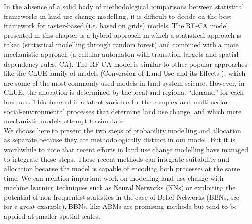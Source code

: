 \documentclass[12pt,Bold,TexShade]{mcgilletdclass}
\begin{document}
{%
In the absence of a solid body of methodological comparisons between statistical frameworks in land use change modelling, it is difficult to decide on the best framework for raster-based (i.e. based on grids) models. The RF-CA model presented in this chapter is a  hybrid approach in which a statistical approach is taken (statistical modelling through random forest) and combined with a more mechanistic approach (a cellular automaton with transition targets and spatial dependency rules, CA). The RF-CA model is similar to other popular approaches like the CLUE family of models (Conversion of Land Use and its Effects \cite{verburg_modeling_2002, verburg_combining_2009}), which are some of the most commonly used models in land system science. However, in CLUE, the allocation is determined by the local and regional “demand” for each land use. This demand is a latent variable for the complex and multi-scalar social-environmental processes that determine land use change, and which more mechanistic models attempt to simulate \citep{verburg_combining_2009}. \\

We choose here to present the two steps of probability modelling and allocation as separate because they are methodologically distinct in our model. But it is worthwhile to note that recent efforts in land use change modelling have managed to integrate those steps. Those recent methods can integrate suitability and allocation because the model is capable of encoding both processes at the same time. We can mention important work on modelling land use change with machine learning techniques such as Neural Networks (NNs) \citep{tayyebi_simulating_2013} or exploiting the potential of non frequentist statistics in the case of Belief Networks (BBNs, see \cite{celio_modeling_2014} for a great example). BBNs, like ABMs are promising methods but tend to be applied at smaller spatial scales. \\

}
\end{document}
